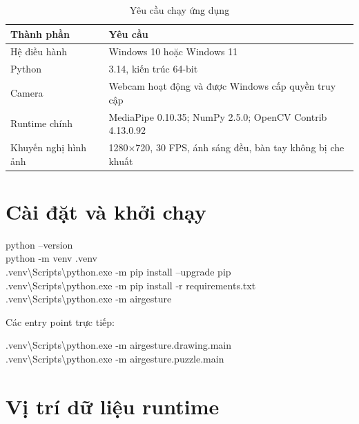 \documentclass[12pt,a4paper,oneside]{report}
\begin{document}
\begin{table}[H]
\centering
\caption{Yêu cầu chạy ứng dụng}
\begin{tabularx}{\textwidth}{L{38mm}Y}
\toprule
\textbf{Thành phần} & \textbf{Yêu cầu}\\
\midrule
Hệ điều hành & Windows 10 hoặc Windows 11\\
Python & 3.14, kiến trúc 64-bit\\
Camera & Webcam hoạt động và được Windows cấp quyền truy cập\\
Runtime chính & MediaPipe 0.10.35; NumPy 2.5.0; OpenCV Contrib 4.13.0.92\\
Khuyến nghị hình ảnh & 1280$\times$720, 30 FPS, ánh sáng đều, bàn tay không bị che khuất\\
\bottomrule
\end{tabularx}
\end{table}

\section{Cài đặt và khởi chạy}

\begin{commandbox}
python --version\\
python -m venv .venv\\
.venv\textbackslash Scripts\textbackslash python.exe -m pip install --upgrade pip\\
.venv\textbackslash Scripts\textbackslash python.exe -m pip install -r requirements.txt\\[2mm]
.venv\textbackslash Scripts\textbackslash python.exe -m airgesture
\end{commandbox}

Các entry point trực tiếp:

\begin{commandbox}
.venv\textbackslash Scripts\textbackslash python.exe -m airgesture.drawing.main\\
.venv\textbackslash Scripts\textbackslash python.exe -m airgesture.puzzle.main
\end{commandbox}

\section{Vị trí dữ liệu runtime}
\end{document}
